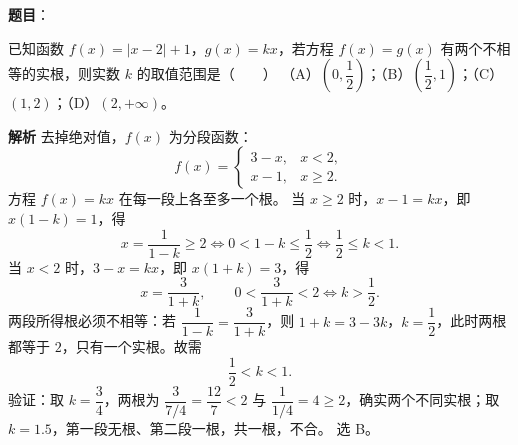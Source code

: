 \begin{answer}

\textbf{题目}：

已知函数 $f(x)=|x-2|+1$，$g(x)=kx$，若方程 $f(x)=g(x)$ 有两个不相等的实根，则实数 $k$ 的取值范围是\mbox{（　　）}
（A）$\left(0,\dfrac12\right)$；（B）$\left(\dfrac12,1\right)$；（C）$(1,2)$；（D）$(2,+\infty)$。

\textbf{解析}
去掉绝对值，$f(x)$ 为分段函数：
\nopagebreak[4]
\[f(x)=\begin{cases}3-x,&x<2,\\x-1,&x\geqslant2 .\end{cases}\]
方程 $f(x)=kx$ 在每一段上各至多一个根。
当 $x\geqslant2$ 时，$x-1=kx$，即 $x(1-k)=1$，得
\nopagebreak[4]
\[x=\frac1{1-k}\geqslant2\iff0<1-k\leqslant\frac12\iff\frac12\leqslant k<1 .\]
当 $x<2$ 时，$3-x=kx$，即 $x(1+k)=3$，得
\nopagebreak[4]
\[x=\frac3{1+k},\qquad 0<\frac3{1+k}<2\iff k>\frac12 .\]
两段所得根必须不相等：若 $\dfrac1{1-k}=\dfrac3{1+k}$，则 $1+k=3-3k$，$k=\dfrac12$，此时两根都等于 $2$，只有一个实根。故需
\nopagebreak[4]
\[\frac12<k<1 .\]
验证：取 $k=\dfrac34$，两根为 $\dfrac3{7/4}=\dfrac{12}7<2$ 与 $\dfrac1{1/4}=4\geqslant2$，确实两个不同实根；取 $k=1.5$，第一段无根、第二段一根，共一根，不合。
选 B。


\end{answer}
